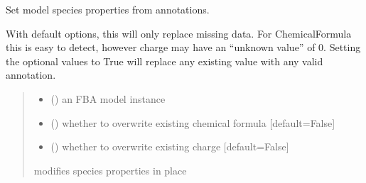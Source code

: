 \documentclass[letterpaper,12pt,english]{sphinxmanual}
\begin{document}
\begin{fulllineitems}
\label{\detokenize{api/core:cbmpy.CBTools.setSpeciesPropertiesFromAnnotations}}
\pysigstartsignatures
\pysiglinewithargsret
{}
{\sphinxparamcomma {}\sphinxparamcomma {}}
{}
\pysigstopsignatures
\sphinxAtStartPar
Set model species properties from annotations.

\sphinxAtStartPar
With default options, this will only replace missing data. For ChemicalFormula
this is easy to detect, however charge may have an “unknown value” of 0.
Setting the optional values to True will replace any existing value with
any valid annotation.
\begin{quote}\begin{description}
\begin{itemize}
\item {} 
\sphinxAtStartPar
{} () \textendash{} an FBA model instance

\item {} 
\sphinxAtStartPar
{} (\sphinxstyleliteralemphasis{\sphinxupquote{, }}) \textendash{} whether to overwrite existing chemical formula {[}default=False{]}

\item {} 
\sphinxAtStartPar
{} (\sphinxstyleliteralemphasis{\sphinxupquote{, }}) \textendash{} whether to overwrite existing charge {[}default=False{]}

\end{itemize}

\sphinxAtStartPar
{} \textendash{} modifies species properties in place

\end{description}\end{quote}

\end{fulllineitems}
\end{document}
